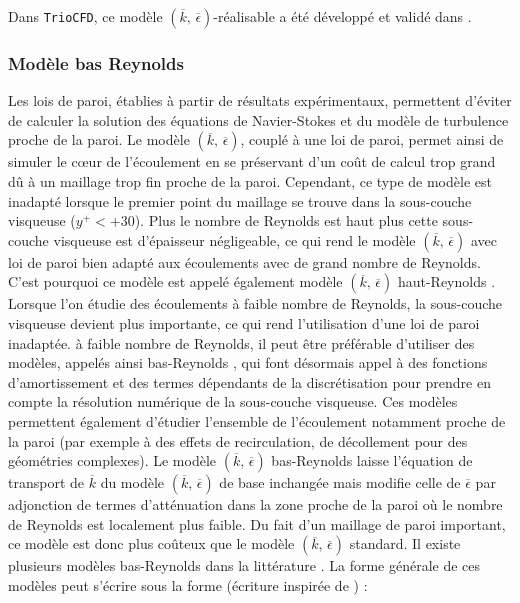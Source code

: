 Dans \texttt{TrioCFD}, ce mod\`ele $(\overline{k},\,\overline{\epsilon})$-\og r\'ealisable \fg{}
a \'et\'e d\'evelopp\'e et valid\'e dans \cite{Angeli_Leterrier_keps-real_NT2018}.


\subsubsection{Mod\`ele \og bas Reynolds \fg{}}

Les lois de paroi, \'etablies \`a partir de r\'esultats exp\'erimentaux, permettent
d\textquoteright \'eviter de calculer la solution des \'equations de Navier-Stokes
et du mod\`ele de turbulence proche de la paroi. Le mod\`ele $(\overline{k},\,\overline{\epsilon})$,
coupl\'e \`a une loi de paroi, permet ainsi de simuler le c\oe ur de
l\textquoteright \'ecoulement en se pr\'eservant d\textquoteright un co\^ut
de calcul trop grand d\^u \`a un maillage trop fin proche de la paroi.
Cependant, ce type de mod\`ele est inadapt\'e lorsque le premier point
du maillage se trouve dans la sous-couche visqueuse ($y^{+}<+30$).
Plus le nombre de Reynolds est haut plus cette sous-couche visqueuse
est d'\'epaisseur n\'egligeable, ce qui rend le mod\`ele $(\overline{k},\,\overline{\epsilon})$
avec loi de paroi bien adapt\'e aux \'ecoulements avec de grand nombre
de Reynolds. C\textquoteright est pourquoi ce mod\`ele est appel\'e \'egalement
mod\`ele $(\overline{k},\,\overline{\epsilon})$ \og haut-Reynolds \fg{}.
Lorsque l\textquoteright on \'etudie des \'ecoulements \`a faible nombre
de Reynolds, la sous-couche visqueuse devient plus importante, ce
qui rend l\textquoteright utilisation d'une loi de paroi inadapt\'ee.
\`a faible nombre de Reynolds, il peut \^etre pr\'ef\'erable d\textquoteright utiliser
des mod\`eles, appel\'es ainsi \og bas-Reynolds \fg{}, qui font d\'esormais
appel \`a des fonctions d\textquoteright amortissement et des termes
d\'ependants de la discr\'etisation pour prendre en compte la r\'esolution
num\'erique de la sous-couche visqueuse. Ces mod\`eles permettent \'egalement
d\textquoteright \'etudier l\textquoteright ensemble de l\textquoteright \'ecoulement
notamment proche de la paroi (par exemple \`a des effets de recirculation,
de d\'ecollement pour des g\'eom\'etries complexes). Le mod\`ele $(\overline{k},\,\overline{\epsilon})$
bas-Reynolds laisse l\textquoteright \'equation de transport de $\overline{k}$
du mod\`ele $(\overline{k},\,\overline{\epsilon})$ de base inchang\'ee
mais modifie celle de $\overline{\epsilon}$ par adjonction de termes
d\textquoteright att\'enuation dans la zone proche de la paroi o\`u le
nombre de Reynolds est localement plus faible. Du fait d\textquoteright un
maillage de paroi important, ce mod\`ele est donc plus co\^uteux que le
mod\`ele $(\overline{k},\,\overline{\epsilon})$ standard. Il existe
plusieurs mod\`eles bas-Reynolds dans la litt\'erature \cite{Launder-Sharma_LettHMT1974,Launder-Spalding_NumCompTurbFlow1974,Jones-Launder_IJHMT1972,Lam-Bremhorst_JFE1981}.
La forme g\'en\'erale de ces mod\`eles peut s'\'ecrire sous la forme (\'ecriture
inspir\'ee de \cite{Jones-Launder_IJHMT1972}) :

